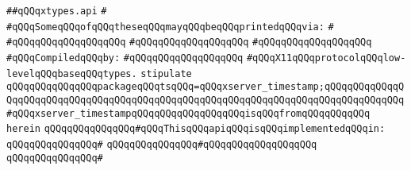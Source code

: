 \label{src/lib/x-kit/xclient/src/wire/xtypes.api}
\verb|##qQQqxtypes.api|\newline
\verb|#|\newline
\verb|#qQQqSomeqQQqofqQQqtheseqQQqmayqQQqbeqQQqprintedqQQqvia:|\newline
\verb|#|\newline
\verb|#qQQqqQQqqQQqqQQqqQQq|\newline
\verb|#qQQqqQQqqQQqqQQqqQQq|\newline
\verb|#qQQqqQQqqQQqqQQqqQQq|\newline
\newline
\verb|#qQQqCompiledqQQqby:|\newline
\verb|#qQQqqQQqqQQqqQQqqQQq|\newline
\newline
\newline
\newline
\verb|#qQQqX11qQQqprotocolqQQqlow-levelqQQqbaseqQQqtypes.|\newline
\newline
\newline
\verb|stipulate|\newline
\verb|qQQqqQQqqQQqqQQqpackageqQQqtsqQQq=qQQqxserver_timestamp;qQQqqQQqqQQqqQQqqQQqqQQqqQQqqQQqqQQqqQQqqQQqqQQqqQQqqQQqqQQqqQQqqQQqqQQqqQQqqQQqqQQq#qQQqxserver_timestampqQQqqQQqqQQqqQQqqQQqisqQQqfromqQQqqQQqqQQq|\newline
\verb|herein|\newline
\newline
\verb|qQQqqQQqqQQqqQQq#qQQqThisqQQqapiqQQqisqQQqimplementedqQQqin:|\newline
\verb|qQQqqQQqqQQqqQQq#|\newline
\verb|qQQqqQQqqQQqqQQq#qQQqqQQqqQQqqQQqqQQq|\newline
\verb|qQQqqQQqqQQqqQQq#|\newline
